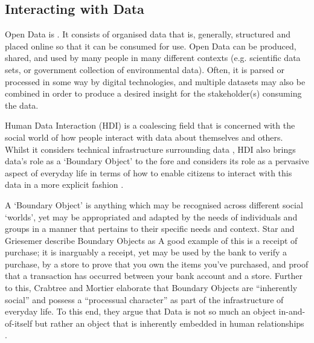 \subsection{Interacting with Data}

Open Data is  \cite{open_data_institute_what_nodate}. It consists of organised data that is, generally, structured and placed online so that it can be consumed for use. Open Data can be produced, shared, and used by many people in many different contexts (e.g. scientific data sets, or government collection of environmental data). Often, it is parsed or processed in some way by digital technologies, and multiple datasets may also be combined in order to produce a desired insight for the stakeholder(s) consuming the data.

Human Data Interaction (HDI) is a coalescing field that is concerned with the social world of how people interact with data about themselves and others. Whilst it considers technical infrastructure surrounding data \cite{mcauley_dataware_2011}, HDI also brings data's role as a `Boundary Object' \cite{star_institutional_1989} to the fore and considers its role as a pervasive aspect of everyday life in terms of how to enable citizens to interact with this data in a more explicit fashion \cite{mortier_human-data_2014}.

A `Boundary Object' is anything which may be recognised across different social `worlds', yet may be appropriated and adapted by the needs of individuals and groups in a manner that pertains to their specific needs and context. Star and Griesemer describe Boundary Objects as  \cite{star_institutional_1989} A good example of this is a receipt of purchase; it is inarguably a receipt, yet may be used by the bank to verify a purchase, by a store to prove that you own the items you've purchased, and proof that a transaction has occurred between your bank account and a store. Further to this, Crabtree and Mortier elaborate that Boundary Objects are ``inherently social'' and possess a ``processual character'' as part of the infrastructure of everyday life. To this end, they argue that Data is not so much an object in-and-of-itself but rather an object that is inherently embedded in human relationships \cite{crabtree_human_2015}.

